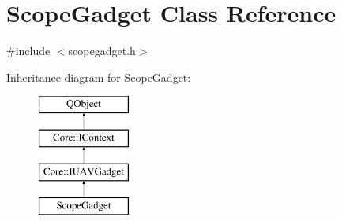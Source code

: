 \hypertarget{class_scope_gadget}{\section{Scope\-Gadget Class Reference}
\label{class_scope_gadget}
}


{\ttfamily \#include $<$scopegadget.\-h$>$}

Inheritance diagram for Scope\-Gadget\-:\begin{figure}[H]
\begin{center}
\leavevmode
\includegraphics[height=4.000000cm]{class_scope_gadget}
\end{center}
\end{figure}
